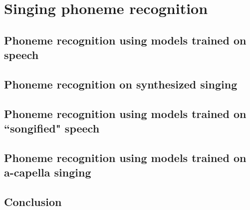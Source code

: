 \chapter{Singing phoneme recognition} \label{chap:phonerec}
\section{Phoneme recognition using models trained on speech}
\section{Phoneme recognition on synthesized singing}
\section{Phoneme recognition using models trained on ``songified" speech}
\section{Phoneme recognition using models trained on a-capella singing}
\section{Conclusion}
